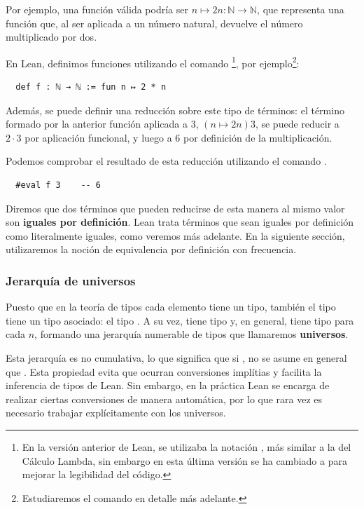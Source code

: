 Por ejemplo, una función válida podría ser $n \mapsto 2n : \mathbb{N} \rightarrow \mathbb{N}$, que representa una función que, al ser aplicada a un número natural, devuelve el número multiplicado por dos.

En Lean, definimos funciones utilizando el comando \footnote{En la versión anterior de Lean, se utilizaba la notación , más similar a la del Cálculo Lambda, sin embargo en esta última versión se ha cambiado a  para mejorar la legibilidad del código.}, por ejemplo\footnote{Estudiaremos el comando  en detalle más adelante.}:

\begin{lstlisting}
  def f : ℕ → ℕ := fun n ↦ 2 * n
\end{lstlisting}

Además, se puede definir una reducción sobre este tipo de términos: el término formado por la anterior función aplicada a $3$, $(n \mapsto 2n)3$, se puede reducir a $2 \cdot 3$ por aplicación funcional, y luego a $6$ por definición de la multiplicación.

Podemos comprobar el resultado de esta reducción utilizando el comando .

\begin{lstlisting}
  #eval f 3    -- 6
\end{lstlisting}

Diremos que dos términos que pueden reducirse de esta manera al mismo valor son \textbf{iguales por definición}. Lean trata términos que sean iguales por definición como literalmente iguales, como veremos más adelante. En la siguiente sección, utilizaremos la noción de equivalencia por definición con frecuencia.

\subsubsection{Jerarquía de universos}

Puesto que en la teoría de tipos cada elemento tiene un tipo, también el tipo  tiene un tipo asociado: el tipo . A su vez,  tiene tipo  y, en general,  tiene tipo  para cada $n$, formando una jerarquía numerable de tipos que llamaremos \textbf{universos}.

Esta jerarquía es no cumulativa, lo que significa que si , no se asume en general que . Esta propiedad evita que ocurran conversiones implítias y facilita la inferencia de tipos de Lean. Sin embargo, en la práctica Lean se encarga de realizar ciertas conversiones de manera automática, por lo que rara vez es necesario trabajar explícitamente con los universos.

